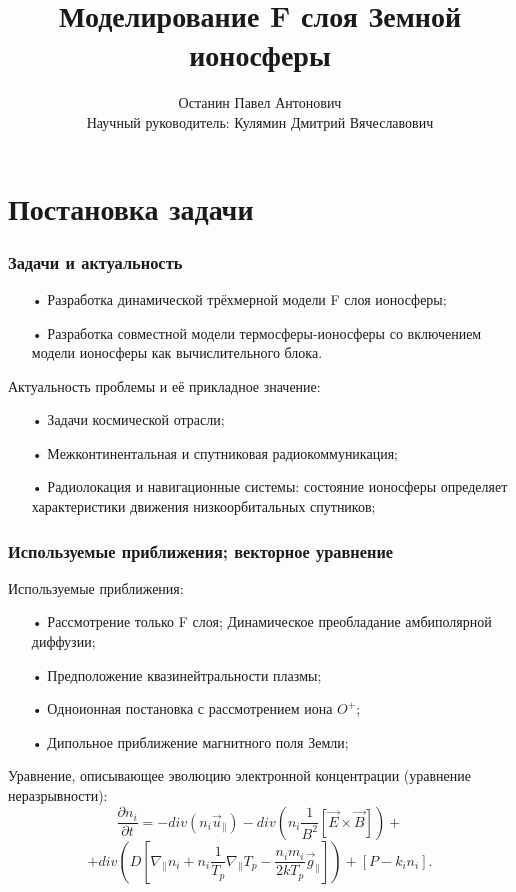 \documentclass[9pt, apectratio=43,unicode]{beamer}
\title[Моделирование F слоя Земной ионосферы]{Моделирование F слоя Земной ионосферы}
\author[Останин П. А.]{Останин Павел Антонович  \\ \vspace{1ex} Научный руководитель: Кулямин Дмитрий Вячеславович}
\date{ }
\begin{document}
\begin{frame}[plain]
\titlepage
\end{frame}

\def\L{\mathcal{L}}

\section{Постановка задачи}
\begin{frame}\frametitle{Задачи и актуальность}
\begin{itemize}
\item[•] Разработка динамической трёхмерной модели F слоя ионосферы;
\item[•] Разработка совместной модели термосферы-ионосферы со включением модели ионосферы как вычислительного блока.
\end{itemize}

Актуальность проблемы и её прикладное значение:
\begin{itemize}
\item[•] Задачи космической отрасли;
\item[•] Межконтинентальная и спутниковая радиокоммуникация;
\item[•] Радиолокация и навигационные системы: состояние ионосферы определяет характеристики движения низкоорбитальных спутников;
\end{itemize}


\end{frame}

\begin{frame}\frametitle{Используемые приближения; векторное уравнение}

Используемые приближения:
\begin{itemize}
\item[•] Рассмотрение только F слоя; Динамическое преобладание амбиполярной диффузии;
\item[•] Предположение квазинейтральности плазмы;
\item[•] Одноионная постановка с рассмотрением иона $O^+$;
\item[•] Дипольное приближение магнитного поля Земли;
\end{itemize}

Уравнение, описывающее эволюцию электронной концентрации (уравнение неразрывности): $$\dfrac{\partial n_i}{\partial t} = -div(n_i \vec{u}_\parallel)-div\left(n_i\dfrac{1}{B^2}[\vec{E}\times \vec{B}] \right)+$$ $$+div\left(D\left[\nabla_\parallel n_i +n_i\dfrac{1}{T_p}\nabla_\parallel T_p - \dfrac{n_i m_i}{2kT_p}\vec{g}_\parallel\right]\right)+[P-k_in_i].$$

\end{frame}
\end{document}
